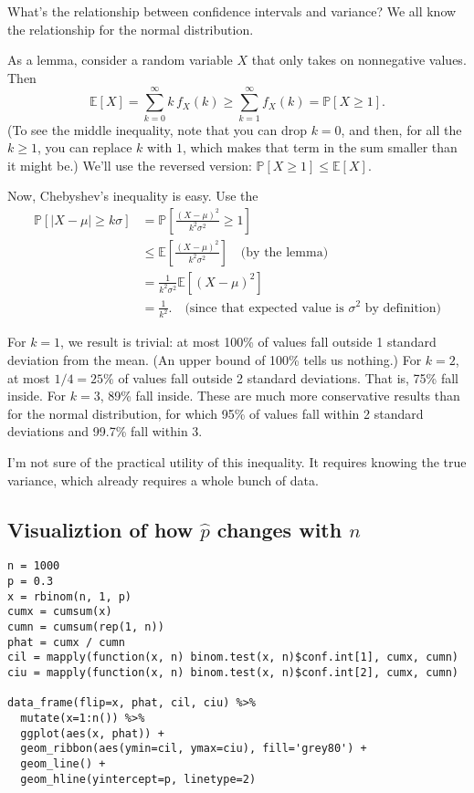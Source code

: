 \documentclass{book}
\begin{document}
What's the relationship between confidence intervals and variance? We
all know the relationship for the normal distribution.

As a lemma, consider a random variable \(X\) that only takes on
nonnegative values. Then \[
\mathbb{E}[X] = \sum_{k=0}^\infty k \, f_X(k) \geq \sum_{k=1}^\infty f_X(k) = \mathbb{P}[X \geq 1].
\] (To see the middle inequality, note that you can drop \(k=0\), and
then, for all the \(k \geq 1\), you can replace \(k\) with \(1\), which
makes that term in the sum smaller than it might be.) We'll use the
reversed version: \(\mathbb{P}[X \geq 1] \leq \mathbb{E}[X]\).

Now, Chebyshev's inequality is easy. Use the \[
\begin{aligned}
\mathbb{P}\left[|X - \mu| \geq k \sigma\right]
  &= \mathbb{P}\left[ \frac{(X - \mu)^2}{k^2 \sigma^2} \geq 1 \right] \\
  &\leq \mathbb{E}\left[ \frac{(X - \mu)^2}{k^2 \sigma^2} \right]
    \quad \text{(by the lemma)} \\
  &= \frac{1}{k^2 \sigma^2} \mathbb{E}\left[(X-\mu)^2\right] \\
  &= \frac{1}{k^2}. \quad \text{(since that expected value is $\sigma^2$ by definition)}
\end{aligned}
\]

For \(k=1\), we result is trivial: at most 100\% of values fall outside
1 standard deviation from the mean. (An upper bound of 100\% tells us
nothing.) For \(k=2\), at most \(1/4 = 25\%\) of values fall outside 2
standard deviations. That is, 75\% fall inside. For \(k=3\), 89\% fall
inside. These are much more conservative results than for the normal
distribution, for which 95\% of values fall within 2 standard deviations
and 99.7\% fall within 3.

I'm not sure of the practical utility of this inequality. It requires
knowing the true variance, which already requires a whole bunch of data.

\subsection{\texorpdfstring{Visualiztion of how \(\hat{p}\) changes with
\(n\)}{Visualiztion of how \textbackslash{}hat\{p\} changes with n}}\label{visualiztion-of-how-hatp-changes-with-n}

\begin{verbatim}
n = 1000
p = 0.3
x = rbinom(n, 1, p)
cumx = cumsum(x)
cumn = cumsum(rep(1, n))
phat = cumx / cumn
cil = mapply(function(x, n) binom.test(x, n)$conf.int[1], cumx, cumn)
ciu = mapply(function(x, n) binom.test(x, n)$conf.int[2], cumx, cumn)

data_frame(flip=x, phat, cil, ciu) %>%
  mutate(x=1:n()) %>%
  ggplot(aes(x, phat)) +
  geom_ribbon(aes(ymin=cil, ymax=ciu), fill='grey80') +
  geom_line() +
  geom_hline(yintercept=p, linetype=2)
\end{verbatim}
\end{document}
